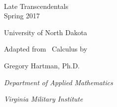 


\begin{flushright}

\textsc{\large \apex\ {\Huge\thetitle}} \\

Late Transcendentals \\
Spring 2017 \\

%

\Large

University of North Dakota\bigskip

\normalsize

Adapted from \apex\ Calculus by

Gregory Hartman, Ph.D.

\emph{\small Department of Applied Mathematics}

\emph{\small Virginia Military Institute}

\end{flushright}
\normalsize
{}
\restoregeometry
